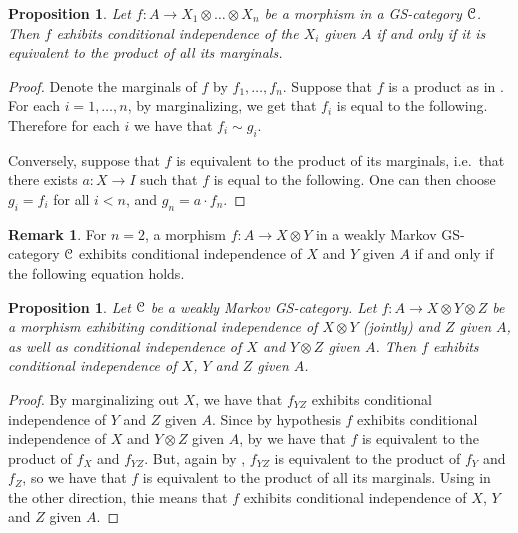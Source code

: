 \documentclass[a4paper,UKenglish,numberwithinsect,cleveref, autoref, thm-restate]{lipics-v2021}
\theoremstyle{plain} %
\newtheorem{myproposition}[mytheorem]{Proposition}
\theoremstyle{definition} %
\newtheorem{myremark}[mytheorem]{Remark}
\begin{document}
\begin{myproposition}\label{eqcondind}
 Let $f:A\to X_1\otimes\dots\otimes X_n$ be a morphism in a GS-category $\mathcal{C}$. Then $f$ exhibits conditional independence of the $X_i$ given $A$ if and only if it is equivalent to the product of all its marginals.
\end{myproposition}
\begin{proof}
 Denote the marginals of $f$ by $f_1,\dots,f_n$.
 Suppose that $f$ is a product as in . For each $i=1,\dots,n$, by marginalizing, we get that $f_i$ is equal to the following.
 Therefore for each $i$ we have that $f_i\sim g_i$. 
 
 Conversely, suppose that $f$ is equivalent to the product of its marginals, i.e.~that there exists $a:X\to I$ such that $f$ is equal to the following.
 One can then choose $g_i=f_i$ for all $i<n$, and $g_n = a\cdot f_n$. 
\end{proof} 
 
\begin{myremark}
 For $n=2$, a morphism $f:A\to X\otimes Y$ in a weakly Markov GS-category $\mathcal{C}$ exhibits conditional independence of $X$ and $Y$ given $A$ 
 if and only if the following equation holds.
\end{myremark}

\begin{myproposition}
 Let $\mathcal{C}$ be a weakly Markov GS-category. Let $f:A\to X\otimes Y\otimes Z$ be a morphism exhibiting conditional independence of $X\otimes Y$ (jointly) and $Z$ given $A$, as well as conditional independence of $X$ and $Y\otimes Z$ given $A$. 
 Then $f$ exhibits conditional independence of $X$, $Y$ and $Z$ given $A$. 
\end{myproposition}

\begin{proof}
 By marginalizing out $X$, we have that $f_{YZ}$ exhibits conditional independence of $Y$ and $Z$ given $A$. 
 Since by hypothesis $f$ exhibits conditional independence of $X$ and $Y\otimes Z$ given $A$, by  we have that $f$ is equivalent to the product  of $f_X$ and $f_{YZ}$. But, again by , $f_{YZ}$ is equivalent to the product of $f_Y$ and $f_Z$, so we have that $f$ is equivalent to the product of all its marginals. Using  in the other direction, thie means that $f$ exhibits conditional independence of $X$, $Y$ and $Z$ given $A$. 
\end{proof}
\end{document}
